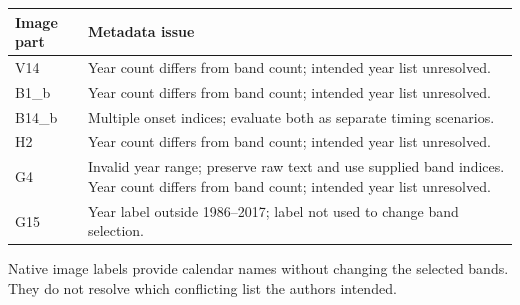 \begin{longtable}{p{.12\linewidth}p{.80\linewidth}}
\toprule Image part & Metadata issue\\\midrule\endhead
V14 & Year count differs from band count; intended year list unresolved.\\
B1\_b & Year count differs from band count; intended year list unresolved.\\
B14\_b & Multiple onset indices; evaluate both as separate timing scenarios.\\
H2 & Year count differs from band count; intended year list unresolved.\\
G4 & Invalid year range; preserve raw text and use supplied band indices. Year count differs from band count; intended year list unresolved.\\
G15 & Year label outside 1986--2017; label not used to change band selection.\\
\bottomrule\end{longtable}

Native image labels provide calendar names without changing the selected bands. They do not resolve which conflicting list the authors intended.

